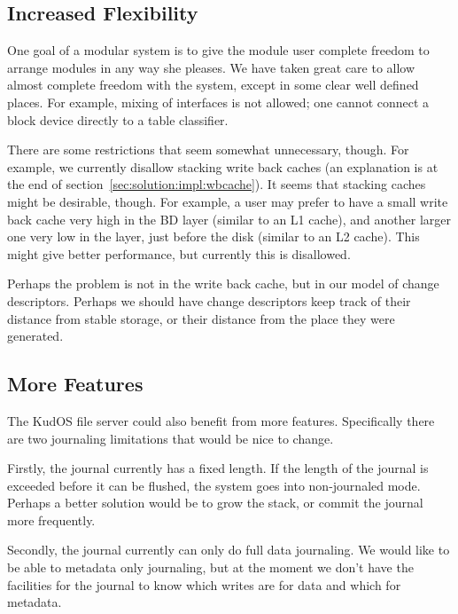 \subsection{Increased Flexibility}
\label{sec:future:flexibility}


One goal of a modular system is to give the module user complete freedom to
arrange modules in any way she pleases. We have taken great care to allow
almost complete freedom with the system, except in some clear well defined
places. For example, mixing of interfaces is not allowed; one cannot
connect a block device directly to a table classifier.

There are some restrictions that seem somewhat unnecessary,
though. For example, we currently disallow stacking write back caches
(an explanation is at the end of
section~\ref{sec:solution:impl:wbcache}). It seems that stacking
caches might be desirable, though. For example, a user may prefer to
have a small write back cache very high in the BD layer (similar to an
L1 cache), and another larger one very low in the layer, just before
the disk (similar to an L2 cache). This might give better performance,
but currently this is disallowed.

Perhaps the problem is not in the write back cache, but in our model of change
descriptors. Perhaps we should have change descriptors keep track of their
distance from stable storage, or their distance from the place they were
generated.

\subsection{More Features}
\label{sec:future:features}

The KudOS file server could also benefit from more features. Specifically there
are two journaling limitations that would be nice to change.

Firstly, the journal currently has a fixed length. If the length of the journal
is exceeded before it can be flushed, the system goes into non-journaled mode.
Perhaps a better solution would be to grow the stack, or commit the journal more
frequently.

Secondly, the journal currently can only do full data journaling. We would like
to be able to metadata only journaling, but at the moment we don't have the
facilities for the journal to know which writes are for data and which for
metadata.

